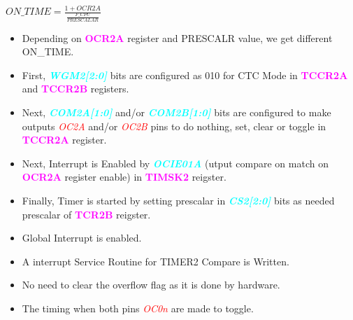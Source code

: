 \documentclass{article}
\newcommand{\bitFormat}[1]{\emph{\textbf{\textcolor{cyan}{#1}}}}
\newcommand{\regFormat}[1]{\textbf{\textcolor{magenta}{#1}}}
\newcommand{\pinFormat}[1]{\emph{\textcolor{red}{#1}}}
\begin{document}
\begin{center}
    $ON\_TIME = \frac{1 + OCR2A}{\frac{F\_CPU}{PRESCALAR}}$
\end{center}
\begin{itemize}
    \item Depending on \regFormat{OCR2A} register and PRESCALR value, we get different ON\_TIME.
    \item First, \bitFormat{WGM2[2:0]} bits are configured as 010 for CTC Mode in \regFormat{TCCR2A} and \regFormat{TCCR2B} registers.
    \item Next, \bitFormat{COM2A[1:0]} and/or \bitFormat{COM2B[1:0]} bits are configured to make outputs \pinFormat{OC2A} and/or \pinFormat{OC2B} pins to do nothing, set, clear or toggle in \regFormat{TCCR2A} register.
    \item Next, Interrupt is Enabled by \bitFormat{OCIE01A} (utput compare on match on \regFormat{OCR2A} register enable) in \regFormat{TIMSK2} reigster.
    \item Finally, Timer is started by setting prescalar in \bitFormat{CS2[2:0]} bits as needed prescalar of \regFormat{TCR2B} reigster.
    \item Global Interrupt is enabled.
    \item A interrupt Service Routine for TIMER2 Compare is Written.
    \item No need to clear the overflow flag as it is done by hardware.
    \item The timing when both pins \pinFormat{OC0n} are made to toggle.
\end{itemize}
\end{document}
